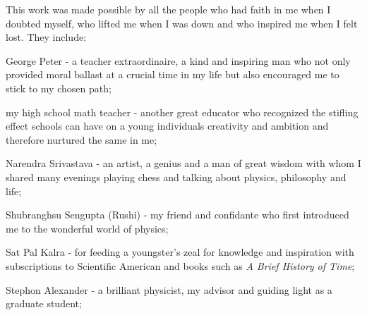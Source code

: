\documentclass[10pt,rmp,aps]{psuthesis}
\begin{document}
\begin{singlespace}
\begin{frontmatter}




\tables


\acknowledgments  %

This work was made possible by all the people who had faith in me when I doubted myself, who lifted me when I was down and who inspired me when I felt lost. They include:

George Peter - a teacher extraordinaire, a kind and inspiring man who not only provided moral ballast at a crucial time in my life but also encouraged me to stick to my chosen path;

my high school math teacher - another great educator who recognized the stifling effect schools can have on a young individuals creativity and ambition and therefore nurtured the same in me;

Narendra Srivastava - an artist, a genius and a man of great wisdom with whom I shared many evenings playing chess and talking about physics, philosophy and life;

Shubranghsu Sengupta (Rushi) - my friend and confidante who first introduced me to the wonderful world of physics;

Sat Pal Kalra - for feeding a youngster's zeal for knowledge and inspiration with subscriptions to Scientific American and books such as \emph{A Brief History of Time};

Stephon Alexander - a brilliant physicist, my advisor and guiding light as a graduate student;


\end{frontmatter}
\end{singlespace}
\end{document}
